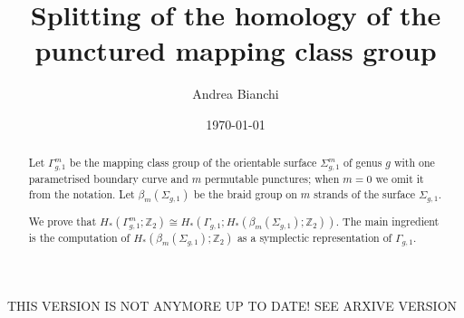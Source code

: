 \documentclass{amsart}
\theoremstyle{plain}
\theoremstyle{definition}
\begin{document}
\title{Splitting of the homology of the punctured mapping class group}

\author{Andrea Bianchi}

\address{Mathematics Institute,
University of Bonn,
Endenicher Allee 60, Bonn,
Germany
}




\date{\today}




\begin{abstract}
Let $\Gamma_{g,1}^m$ be the mapping class group of the orientable surface $\Sigma_{g,1}^m$ of genus $g$ with one parametrised
boundary curve and $m$ permutable punctures; when $m=0$ we omit it from the notation.
Let $\beta_{m}(\Sigma_{g,1})$ be the braid group on $m$ strands
of the surface $\Sigma_{g,1}$.

\noindent We prove that $H_*(\Gamma_{g,1}^m;\mathbb{Z}_2)\cong H_*(\Gamma_{g,1};H_*(\beta_{m}(\Sigma_{g,1});\mathbb{Z}_2))$. The main ingredient
is the computation of $H_*(\beta_{m}(\Sigma_{g,1});\mathbb{Z}_2)$ as a symplectic representation of $\Gamma_{g,1}$.

% 
% 
\end{abstract}


\maketitle
THIS VERSION IS NOT ANYMORE UP TO DATE! SEE ARXIVE VERSION












 
% 

{}

\end{document}
